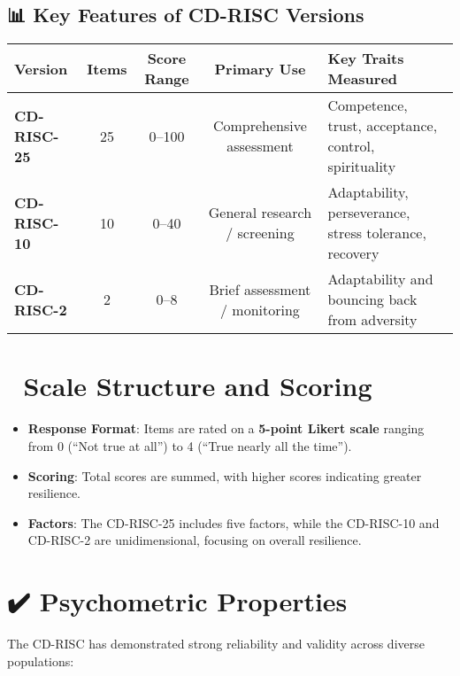 \documentclass[12pt]{article}
\begin{document}
\subsection*{📊 Key Features of CD-RISC Versions}

\begin{center}
\begin{tabular}{>{\bfseries}l c c c l}
\toprule
Version & Items & Score Range & Primary Use & Key Traits Measured \\
\midrule
CD-RISC-25 & 25 & 0--100 & Comprehensive assessment & Competence, trust, acceptance, control, spirituality \\
CD-RISC-10 & 10 & 0--40 & General research / screening & Adaptability, perseverance, stress tolerance, recovery \\
CD-RISC-2 & 2 & 0--8 & Brief assessment / monitoring & Adaptability and bouncing back from adversity \\
\bottomrule
\end{tabular}
\end{center}

\section*{📝 Scale Structure and Scoring}

\begin{itemize}
    \item \textbf{Response Format}: Items are rated on a \textbf{5-point Likert scale} ranging from 0 (``Not true at all'') to 4 (``True nearly all the time'').
    \item \textbf{Scoring}: Total scores are summed, with higher scores indicating greater resilience.
    \item \textbf{Factors}: The CD-RISC-25 includes five factors, while the CD-RISC-10 and CD-RISC-2 are unidimensional, focusing on overall resilience.
\end{itemize}

\section*{✔️ Psychometric Properties}

The CD-RISC has demonstrated strong reliability and validity across diverse populations:
\end{document}
